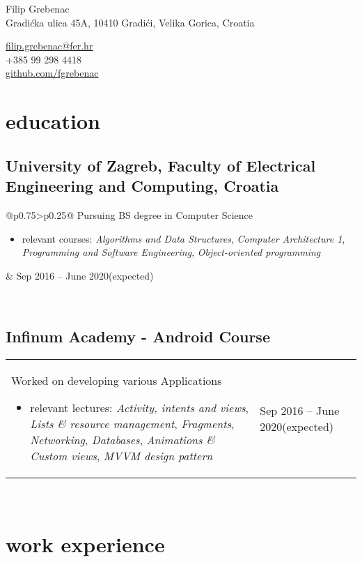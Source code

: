 \documentclass[a4paper]{article}
\makeatletter
\newlength{\tablewidth}
\newenvironment{period}[2]{%
\newcommand{\sarma}{#2}%
\setlength{\tablewidth}{\linewidth}
\addtolength{\tablewidth}{-2\tabcolsep}
\begin{tabular}{@{}p{0.75\tablewidth}>{\raggedleft\arraybackslash}p{0.25\tablewidth}@{}}%
#1 \newline
\begin{itemize}
}{%
\end{itemize} & \sarma \\%
\end{tabular}\\
}
\makeatother
\begin{document}
\fontfamily{\sfdefault}
\selectfont

\begin{minipage}{.5\textwidth}
\LARGE{Filip Grebenac}\\
\normalsize{Gradićka ulica 45A, 10410 Gradići, Velika Gorica, Croatia}
\end{minipage}%
\begin{minipage}{.5\textwidth}
\raggedleft
\href{mailto:ime.prezime@gmail.com}{filip.grebenac@fer.hr} \\
+385 99 298 4418 \\
\href{https://github.com/iprezime}{github.com/fgrebenac}
\end{minipage}

\vspace{1em}


\section{education}
\subsection{University of Zagreb, Faculty of Electrical Engineering and Computing, Croatia}
\begin{period}{Pursuing BS degree in Computer Science}{Sep 2016 -- June 2020\linebreak(expected)}
    \item relevant courses:
        \textit{Algorithms and Data Structures},
        \textit{Computer Architecture 1},
        \textit{Programming and Software Engineering},
        \textit{Object-oriented programming}
\end{period}

\subsection{Infinum Academy - Android Course}
\begin{period}{Worked on developing various Applications}{Jul 2018 -- Aug 2018}
    \item relevant lectures:
        \textit{Activity, intents and views},
        \textit{Lists \& resource management},
        \textit{Fragments},
        \textit{Networking},
        \textit{Databases},
        \textit{Animations \& Custom views},
        \textit{MVVM design pattern}
\end{period}

\section{work experience}
\end{document}
